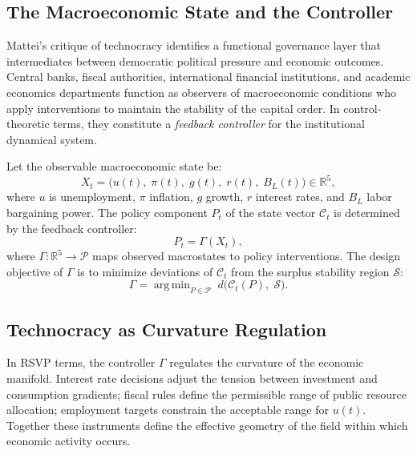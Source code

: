\documentclass[12pt,a4paper]{article}
\theoremstyle{definition}
\theoremstyle{remark}
\DeclareMathOperator*{\argmin}{arg\,min}
\begin{document}
\subsection{The Macroeconomic State and the Controller}

Mattei's critique of technocracy identifies a functional governance layer that intermediates between democratic political pressure and economic outcomes. Central banks, fiscal authorities, international financial institutions, and academic economics departments function as observers of macroeconomic conditions who apply interventions to maintain the stability of the capital order. In control-theoretic terms, they constitute a \emph{feedback controller} for the institutional dynamical system.

Let the observable macroeconomic state be:
\begin{equation}
  X_t = \bigl(u(t),\; \pi(t),\; g(t),\; r(t),\; B_L(t)\bigr) \in \mathbb{R}^5,
\end{equation}
where $u$ is unemployment, $\pi$ inflation, $g$ growth, $r$ interest rates, and $B_L$ labor bargaining power. The policy component $P_t$ of the state vector $\mathcal{C}_t$ is determined by the feedback controller:
\begin{equation}
  \label{eq:controller}
  P_t = \Gamma(X_t),
\end{equation}
where $\Gamma : \mathbb{R}^5 \to \mathcal{P}$ maps observed macrostates to policy interventions. The design objective of $\Gamma$ is to minimize deviations of $\mathcal{C}_t$ from the surplus stability region $\mathcal{S}$:
\begin{equation}
  \label{eq:control_objective}
  \Gamma = \argmin_{P \in \mathcal{P}} \; d\!\bigl(\mathcal{C}_t(P),\; \mathcal{S}\bigr).
\end{equation}

\subsection{Technocracy as Curvature Regulation}

In RSVP terms, the controller $\Gamma$ regulates the curvature of the economic manifold. Interest rate decisions adjust the tension between investment and consumption gradients; fiscal rules define the permissible range of public resource allocation; employment targets constrain the acceptable range for $u(t)$. Together these instruments define the effective geometry of the field within which economic activity occurs.
\end{document}
